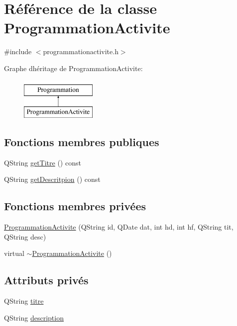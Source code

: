 \hypertarget{class_programmation_activite}{}\section{Référence de la classe Programmation\+Activite}
\label{class_programmation_activite}


{\ttfamily \#include $<$programmationactivite.\+h$>$}

Graphe d\textquotesingle{}héritage de Programmation\+Activite\+:\begin{figure}[H]
\begin{center}
\leavevmode
\includegraphics[height=2.000000cm]{class_programmation_activite}
\end{center}
\end{figure}
\subsection*{Fonctions membres publiques}
\begin{DoxyCompactItemize}
\item 
Q\+String \hyperlink{class_programmation_activite_a8a29a5c0e39ad57aaf2ed73c8a004d3c}{get\+Titre} () const 
\item 
Q\+String \hyperlink{class_programmation_activite_a91de19dc76479adeddac07b5a259c026}{get\+Descritpion} () const 
\end{DoxyCompactItemize}
\subsection*{Fonctions membres privées}
\begin{DoxyCompactItemize}
\item 
\hyperlink{class_programmation_activite_a2492901bfd220779a942fabade7486d1}{Programmation\+Activite} (Q\+String id, Q\+Date dat, int hd, int hf, Q\+String tit, Q\+String desc)
\item 
virtual \hyperlink{class_programmation_activite_acd35d754d36b98a94b5b846378100c33}{$\sim$\+Programmation\+Activite} ()
\end{DoxyCompactItemize}
\subsection*{Attributs privés}
\begin{DoxyCompactItemize}
\item 
Q\+String \hyperlink{class_programmation_activite_aa6f6ff264184635b35615abb4e45ab62}{titre}
\item 
Q\+String \hyperlink{class_programmation_activite_ae2a01c5cfffda9813ae77c1b98c7a52b}{description}
\end{DoxyCompactItemize}
